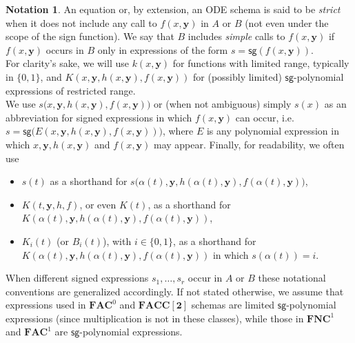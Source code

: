 \documentclass[11pt, oneside]{article}
\newcommand{\fun}[1]{\mathsf{#1}}
\newcommand{\NC}{\mathbf{FNC}}
\newcommand{\AC}{\mathbf{FAC}}
\newcommand{\FACC}{\mathbf{FACC[2]}}
\newcommand{\tu}[1]{\mathbf{#1}}
\theoremstyle{definition}
\newtheorem{notation}{Notation}
\begin{document}
\begin{notation}\label{notation:strict}
    An equation or, by extension, an ODE schema is said to be \emph{strict} when it does not include any call to $f(x, \tu y)$ in $A$ or $B$ (not even under the scope of the sign function). 
    We say that $B$ includes \emph{simple} calls to $f(x,\tu y)$ if $f(x,\tu y)$ occurs in $B$ only in expressions of the form $s=\fun{sg}(f(x,\tu y))$.
    \\
    For clarity's sake, we will use $k(x, \tu y)$ for functions with limited range, typically in $\{0,1\}$, and $K(x, \tu y, h(x, \tu y), f(x, \tu y))$ for (possibly limited) $\fun{sg}$-polynomial expressions of restricted range.
    \\
    We use $s\big(x,\tu y, h(x, \tu y), f(x, \tu y)\big)$ or (when not ambiguous) simply $s(x)$ as an abbreviation for signed expressions in which $f(x, \tu y)$ can occur, i.e.~$s=\fun{sg}\big(E(x, \tu y, h(x, \tu y), f(x, \tu y))\big)$, where $E$ is any polynomial expression in which $x, \tu y, h(x, \tu y)$ and $f(x, \tu y)$ may appear.
    Finally, for readability, we often use 
    \begin{itemize}
        \itemsep0em
        \item $s(t)$ as a shorthand for $s\big(\alpha(t),\tu y, h(\alpha(t), \tu y), f(\alpha(t), \tu y)\big)$, 
        \item $K(t,\tu y, h, f)$, or even $K(t)$, as a shorthand for $K(\alpha(t), \tu y, h(\alpha(t),\tu y), f(\alpha(t), \tu y))$,
        \item $K_i(t)$ (or $B_i(t)$), with $i\in \{0,1\}$, as a shorthand for $K(\alpha(t), \tu y, h(\alpha(t), \tu y), f(\alpha(t), \tu y))$ in which $s(\alpha(t))=i$.
    \end{itemize}
    When different signed expressions $s_1, \dots, s_r$ occur in $A$ or $B$ these notational conventions are generalized accordingly.
    If not stated otherwise, we assume that expressions used in $\AC^0$ and $\FACC$ schemas are limited $\fun{sg}$-polynomial expressions (since multiplication is not in these classes), while those in $\NC^1$ and $\AC^1$ are $\fun{sg}$-polynomial expressions.
\end{notation}
\end{document}
